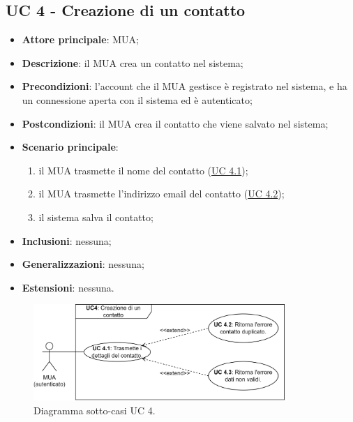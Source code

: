 \subsection{UC 4 - Creazione di un contatto} \label{sec:UC4}
    \begin{itemize}
        \item \textbf{Attore principale}: MUA;
        \item \textbf{Descrizione}: il MUA crea un contatto nel sistema;
        \item \textbf{Precondizioni}: l’account che il MUA gestisce è registrato nel sistema, e ha un connessione aperta con il sistema ed è autenticato;
        \item \textbf{Postcondizioni}: il MUA crea il contatto che viene salvato nel sistema;
        \item \textbf{Scenario principale}:
            \begin{enumerate}
                \item il MUA trasmette il nome del contatto (\hyperref[sec:UC4.1]{UC 4.1});
                \item il MUA trasmette l'indirizzo email del contatto (\hyperref[sec:UC4.2]{UC 4.2});
                \item il sistema salva il contatto;
            \end{enumerate}
        \item \textbf{Inclusioni}: nessuna;
        \item \textbf{Generalizzazioni}: nessuna;
        \item \textbf{Estensioni}: nessuna.
    \end{itemize}

\begin{figure}[h]
    \includegraphics[width=0.85\textwidth]{sections/uc_imgs/UC04.X.png}
    \centering
    \caption{Diagramma sotto-casi UC 4.}
\end{figure}

